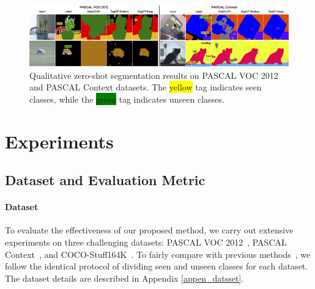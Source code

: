 \documentclass[nohyperref]{article}
\theoremstyle{plain}
\theoremstyle{definition}
\theoremstyle{remark}
\begin{document}
\begin{figure}[!t]
\vskip 0.1in
\begin{center}
\includegraphics[width=0.95\linewidth]{fig/seg.jpg}
\caption{Qualitative zero-shot segmentation results on PASCAL VOC 2012 and PASCAL Context datasets. The  \colorbox{yellow}{yellow} tag indicates seen classes, while the \colorbox{green}{green} tag indicates unseen classes.}
\label{fig_seg}
\end{center}
\vskip -0.1in
\end{figure}






\section{Experiments}

\subsection{Dataset and Evaluation Metric}
\paragraph{Dataset}
To evaluate the effectiveness of our proposed method, we carry out extensive experiments on three challenging datasets: PASCAL VOC 2012~\cite{everingham2012pascal}, PASCAL  Context~\cite{mottaghi2014role}, and COCO-Stuff164K~\cite{caesar2018coco}.  To fairly compare with previous methods~\cite{bucher2019zero,xu2021zsseg,ding2022zegformer,zhou2022maskclip,zhou2022zegclip}, we follow the identical protocol of dividing seen and unseen classes for each dataset. 
The dataset details are described in Appendix \ref{appen_datsset}.

\vspace{-0.2em}
\end{document}
